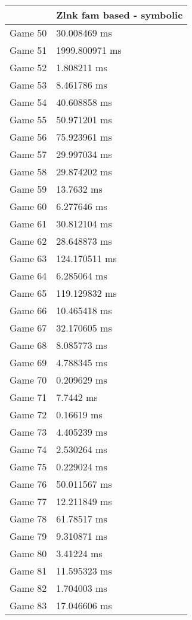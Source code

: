 \begin{tabular}{|l|l|}
	\hline
	& Zlnk fam based - symbolic \\ \hline
	Game 50 & 30.008469 ms \\ \hline
	Game 51 & 1999.800971 ms \\ \hline
	Game 52 & 1.808211 ms \\ \hline
	Game 53 & 8.461786 ms \\ \hline
	Game 54 & 40.608858 ms \\ \hline
	Game 55 & 50.971201 ms \\ \hline
	Game 56 & 75.923961 ms \\ \hline
	Game 57 & 29.997034 ms \\ \hline
	Game 58 & 29.874202 ms \\ \hline
	Game 59 & 13.7632 ms \\ \hline
	Game 60 & 6.277646 ms \\ \hline
	Game 61 & 30.812104 ms \\ \hline
	Game 62 & 28.648873 ms \\ \hline
	Game 63 & 124.170511 ms \\ \hline
	Game 64 & 6.285064 ms \\ \hline
	Game 65 & 119.129832 ms \\ \hline
	Game 66 & 10.465418 ms \\ \hline
	Game 67 & 32.170605 ms \\ \hline
	Game 68 & 8.085773 ms \\ \hline
	Game 69 & 4.788345 ms \\ \hline
	Game 70 & 0.209629 ms \\ \hline
	Game 71 & 7.7442 ms \\ \hline
	Game 72 & 0.16619 ms \\ \hline
	Game 73 & 4.405239 ms \\ \hline
	Game 74 & 2.530264 ms \\ \hline
	Game 75 & 0.229024 ms \\ \hline
	Game 76 & 50.011567 ms \\ \hline
	Game 77 & 12.211849 ms \\ \hline
	Game 78 & 61.78517 ms \\ \hline
	Game 79 & 9.310871 ms \\ \hline
	Game 80 & 3.41224 ms \\ \hline
	Game 81 & 11.595323 ms \\ \hline
	Game 82 & 1.704003 ms \\ \hline
	Game 83 & 17.046606 ms \\ \hline

\end{tabular}
